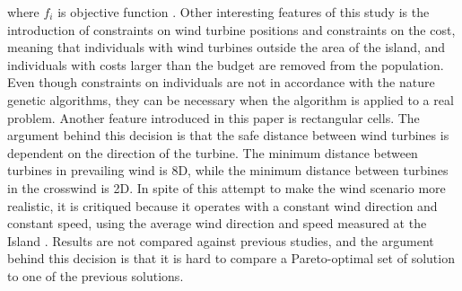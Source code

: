where $f_i$ is objective function \citep{Murata}. Other interesting features of this study is the introduction of constraints on wind turbine positions and constraints on the cost, meaning that individuals with wind turbines outside the area of the island, and individuals with costs larger than the budget are removed from the population. Even though constraints on individuals are not in accordance with the nature genetic algorithms, they can be necessary when the algorithm is applied to a real problem. Another feature introduced in this paper is rectangular cells. The argument behind this decision is that the safe distance between wind turbines is dependent on the direction of the turbine. The minimum distance between turbines in prevailing wind is 8D, while the minimum distance between turbines in the crosswind is 2D. In spite of this attempt to make the wind scenario more realistic, it is critiqued because it operates with a constant wind direction and constant speed, using the average wind direction and speed measured at the Island \citep{Samorani}. Results are not compared against previous studies, and the argument behind this decision is that it is hard to compare a Pareto-optimal set of solution to one of the previous solutions. \\


